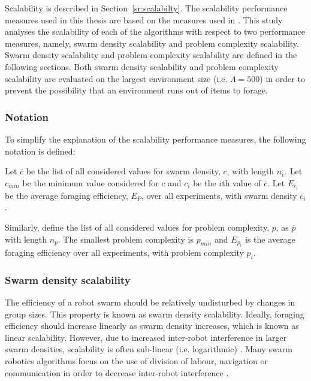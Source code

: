 Scalability is described in Section~\ref{sr:scalabilty}. The scalability performance measures used in this thesis are based on the measures used in \cite{hecker2015beyond}. This study analyses the scalability of each of the algorithms with respect to two performance measures, namely, swarm density scalability and problem complexity scalability. Swarm density scalability and problem complexity scalability are defined in the following sections. Both swarm density scalability and problem complexity scalability are evaluated on the largest environment size (i.e. $\Lambda=500$) in order to prevent the possibility that an environment runs out of items to forage.

\subsubsection{Notation}

To simplify the explanation of the scalability performance measures, the following notation is defined:

Let $\overline{c}$ be the list of all considered values for swarm density, $c$, with length $n_c$. Let $c_{min}$ be the minimum value considered for $c$ and $c_i$ be the $i$th value of $\overline{c}$. Let $E_{c_i}$ be the average foraging efficiency, $E_P$, over all experiments, with swarm density $c_i$.

Similarly, define the list of all considered values for problem complexity, $p$, as $\overline{p}$ with length $n_p$. The smallest problem complexity is $p_{min}$ and $E_{p_i}$ is the average foraging efficiency over all experiments, with problem complexity $p_i$.


\subsubsection{Swarm density scalability}
\label{swarmsizescalability}

The efficiency of a robot swarm should be relatively undisturbed by changes in group sizes. This property is known as swarm density scalability. Ideally, foraging efficiency should increase linearly as swarm density increases, which is known as linear scalability. However, due to increased inter-robot interference in larger swarm densities, scalability is often sub-linear (i.e. logarithmic) \cite{lerman2002mathematical}. Many swarm robotics algorithms focus on the use of division of labour, navigation or communication in order to decrease inter-robot interference \cite{lerman2002mathematical, schneider1998territorial}.

